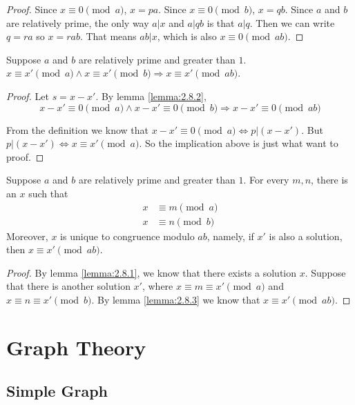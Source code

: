 \documentclass[11pt]{article}
\begin{document}
\begin{proof}
Since $x \equiv 0 \pmod{a}$, $x = pa$. Since $x \equiv 0 \pmod{b}$, $x = qb$. Since $a$ and
$b$ are relatively prime, the only way $a|x$ and $a|qb$ is that $a|q$. Then we can write
$q=ra$ so $x=rab$. That means $ab|x$, which is also $x \equiv 0 \pmod{ab}$.
\end{proof}

\begin{lemma} \label{lemma:2.8.3}
Suppose $a$ and $b$ are relatively prime and greater than $1$.
$x \equiv x' \pmod{a} \wedge x \equiv x' \pmod{b} \Rightarrow x \equiv x' \pmod{ab}$.
\end{lemma}

\begin{proof}
Let $s = x - x'$. By lemma \ref{lemma:2.8.2},
\[
x-x' \equiv 0 \pmod{a} \wedge x-x' \equiv 0 \pmod{b} \Rightarrow x-x' \equiv 0 \pmod{ab}
\]

From the definition we know that $x-x' \equiv 0 \pmod{a} \Leftrightarrow p|(x-x')$. But
$p|(x-x') \Leftrightarrow x \equiv x' \pmod{a}$. So the implication above is just what want
to proof.
\end{proof}

\begin{theorem} \label{theorem:2.8}
Suppose $a$ and $b$ are relatively prime and greater than $1$. For every $m,n$, there is an
$x$ such that
\begin{align*}
x &\equiv m \pmod{a} \\
x &\equiv n \pmod{b}
\end{align*}
Moreover, $x$ is unique to congruence modulo $ab$, namely, if $x'$ is also a solution, then
$x \equiv x' \pmod{ab}$.
\end{theorem}

\begin{proof}
By lemma \ref{lemma:2.8.1}, we know that there exists a solution $x$. Suppose that there is
another solution $x'$, where $x \equiv m \equiv x' \pmod{a}$ and $x \equiv n \equiv x'
\pmod{b}$. By lemma \ref{lemma:2.8.3} we know that $x \equiv x' \pmod{ab}$.
\end{proof}


\section{Graph Theory}

\subsection{Simple Graph}
\end{document}
